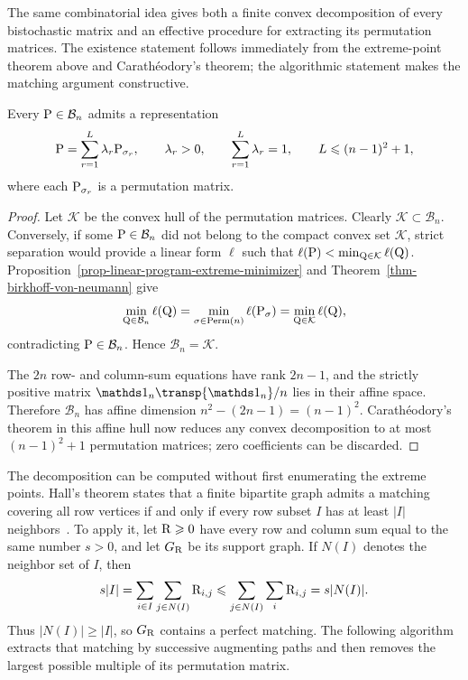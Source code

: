 The same combinatorial idea gives both a finite convex decomposition of every bistochastic matrix and an effective procedure for extracting its permutation matrices. The existence statement follows immediately from the extreme-point theorem above and Carath\'eodory's theorem; the algorithmic statement makes the matching argument constructive.

\begin{cor}\label{cor-birkhoff-von-neumann-decomposition}
	Every $\P\in\mathcal B_n$ admits a representation
	\[
		\P=\sum_{r=1}^{L}\lambda_r\P_{\sigma_r},
		\qquad
		\lambda_r>0,
		\qquad
		\sum_{r=1}^{L}\lambda_r=1,
		\qquad
		L\leq (n-1)^2+1,
	\]
	where each $\P_{\sigma_r}$ is a permutation matrix.
\end{cor}
\begin{proof}
	Let $\mathcal K$ be the convex hull of the permutation matrices. Clearly $\mathcal K\subset\mathcal B_n$. Conversely, if some $\P\in\mathcal B_n$ did not belong to the compact convex set $\mathcal K$, strict separation would provide a linear form $\ell$ such that $\ell(\P)<\min_{\Q\in\mathcal K}\ell(\Q)$. Proposition~\ref{prop-linear-program-extreme-minimizer} and Theorem~\ref{thm-birkhoff-von-neumann} give
	\[
		\min_{\Q\in\mathcal B_n}\ell(\Q)
		=\min_{\sigma\in\Perm(n)}\ell(\P_\sigma)
		=\min_{\Q\in\mathcal K}\ell(\Q),
	\]
	contradicting $\P\in\mathcal B_n$. Hence $\mathcal B_n=\mathcal K$.

	The $2n$ row- and column-sum equations have rank $2n-1$, and the strictly positive matrix $\ones_n\transp{\ones_n}/n$ lies in their affine space. Therefore $\mathcal B_n$ has affine dimension $n^2-(2n-1)=(n-1)^2$. Carath\'eodory's theorem in this affine hull now reduces any convex decomposition to at most $(n-1)^2+1$ permutation matrices; zero coefficients can be discarded.
\end{proof}

The decomposition can be computed without first enumerating the extreme points. Hall's theorem states that a finite bipartite graph admits a matching covering all row vertices if and only if every row subset $I$ has at least $|I|$ neighbors~\cite{Hall1935}. To apply it, let $\R\geq 0$ have every row and column sum equal to the same number $s>0$, and let $G_{\R}$ be its support graph. If $N(I)$ denotes the neighbor set of $I$, then
\[
	s|I|
	=\sum_{i\in I}\sum_{j\in N(I)}\R_{i,j}
	\leq\sum_{j\in N(I)}\sum_i\R_{i,j}
	=s|N(I)|.
\]
Thus $|N(I)|\geq |I|$, so $G_{\R}$ contains a perfect matching. The following algorithm extracts that matching by successive augmenting paths and then removes the largest possible multiple of its permutation matrix.

